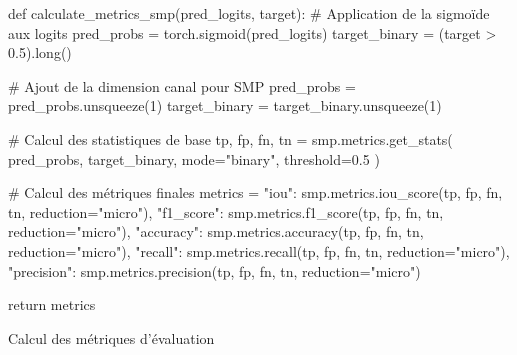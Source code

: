 \begin{code}[H]
    \begin{pythoncode}
    def calculate_metrics_smp(pred_logits, target):
        # Application de la sigmoïde aux logits
        pred_probs = torch.sigmoid(pred_logits)
        target_binary = (target > 0.5).long()
        
        # Ajout de la dimension canal pour SMP
        pred_probs = pred_probs.unsqueeze(1)
        target_binary = target_binary.unsqueeze(1)
        
        # Calcul des statistiques de base
        tp, fp, fn, tn = smp.metrics.get_stats(
            pred_probs, target_binary,
            mode="binary", threshold=0.5
        )
        
        # Calcul des métriques finales
        metrics = {
            "iou": smp.metrics.iou_score(tp, fp, fn, tn, reduction="micro"),
            "f1_score": smp.metrics.f1_score(tp, fp, fn, tn, reduction="micro"),
            "accuracy": smp.metrics.accuracy(tp, fp, fn, tn, reduction="micro"),
            "recall": smp.metrics.recall(tp, fp, fn, tn, reduction="micro"),
            "precision": smp.metrics.precision(tp, fp, fn, tn, reduction="micro")
        }
        
        return metrics
    \end{pythoncode}
    \caption{Calcul des métriques d'évaluation}
    \label{code:ch36_calcul_metriques}
\end{code}

